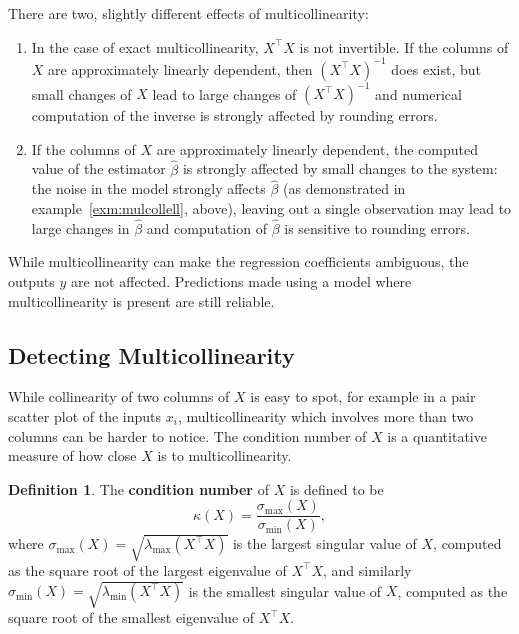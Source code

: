 \documentclass[
  a4paper,
]{article}
\theoremstyle{definition}
\newtheorem{definition}{Definition}[section]
\theoremstyle{definition}
\theoremstyle{definition}
\theoremstyle{definition}
\theoremstyle{remark}
\begin{document}
There are two, slightly different effects of multicollinearity:

\begin{enumerate}
\def\labelenumi{\arabic{enumi}.}
\item
  In the case of exact multicollinearity, \(X^\top X\) is not invertible.
  If the columns of \(X\) are approximately linearly dependent, then
  \((X^\top X)^{-1}\) does exist, but small changes of \(X\) lead to large changes
  of \((X^\top X)^{-1}\) and numerical computation of the inverse is
  strongly affected by rounding errors.
\item
  If the columns of \(X\) are approximately linearly dependent,
  the computed value of the estimator \(\hat\beta\) is strongly affected
  by small changes to the system: the noise in the model strongly affects
  \(\hat\beta\) (as demonstrated in example~\ref{exm:mulcollell}, above),
  leaving out a single observation may lead to large changes in \(\hat\beta\)
  and computation of \(\hat\beta\) is sensitive to rounding errors.
\end{enumerate}

While multicollinearity can make the regression coefficients ambiguous,
the outputs \(y\) are not affected. Predictions made using a model
where multicollinearity is present are still reliable.

\hypertarget{detecting-multicollinearity}{%
\subsection{Detecting Multicollinearity}\label{detecting-multicollinearity}}

While collinearity of two columns of \(X\) is easy to spot, for example in
a pair scatter plot of the inputs \(x_i\), multicollinearity which involves
more than two columns can be harder to notice. The condition number of
\(X\) is a quantitative measure of how close \(X\) is to multicollinearity.

\begin{definition}
The \textbf{condition number} of \(X\) is defined to be
\begin{equation*}
  \kappa(X)
  = \frac{\sigma_\mathrm{max}(X)}{\sigma_\mathrm{min}(X)},
\end{equation*}
where \(\sigma_\mathrm{max}(X) = \sqrt{\lambda_\mathrm{max}(X^\top X)}\) is the
largest singular value of \(X\), computed as the square root of the largest
eigenvalue of \(X^\top X\), and similarly \(\sigma_\mathrm{min}(X) = \sqrt{\lambda_\mathrm{min}(X^\top X)}\) is the smallest singular value of \(X\),
computed as the square root of the smallest eigenvalue of \(X^\top X\).
\end{definition}
\end{document}
